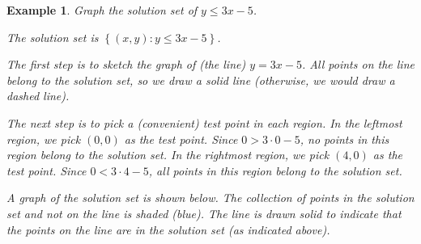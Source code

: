 \documentclass[11pt]{book}               %
\newtheorem{example}{Example}
\begin{document}
\begin{example}
Graph the solution set of $y \leq 3x-5$.
\normalfont

The solution set is $\left\{(x,y): y \leq 3x - 5 \right\}$.

The first step is to sketch the graph of (the line) $y = 3x - 5$.
All points on the line belong to the solution set, so we draw a solid line (otherwise, 
we would draw a dashed line).

The next step is to pick a (convenient) test point in each region.
In the leftmost region, we pick $(0, 0)$ as the test point.
Since $0 > 3\cdot 0 - 5$, no points in this region belong to the
solution set.
In the rightmost region, we pick $(4, 0)$ as the test point.
Since $0 < 3\cdot 4 - 5$, all points in this region belong to the solution set.

A graph of the solution set is shown below.  The collection of points in the solution
set and not on the line is shaded (blue).  The line is drawn solid to indicate
that the points on the line are in the solution set (as indicated above).

 \begin{center}
\end{center}

\end{example}
\end{document}
